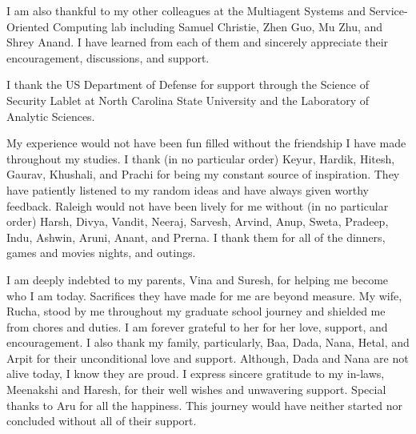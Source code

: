\begin{acknowledgements}
I am also thankful to my other colleagues at the Multiagent Systems and Service-Oriented Computing lab including Samuel Christie, Zhen Guo, Mu Zhu, and Shrey Anand. I have learned from each of them and sincerely appreciate their encouragement, discussions, and support. 

I thank the US Department of Defense for support through the
Science of Security Lablet at North Carolina State University and the Laboratory of Analytic Sciences.

My experience would not have been fun filled without the friendship I have made throughout my studies. 
I thank (in no particular order) Keyur, Hardik, Hitesh, Gaurav, Khushali, and Prachi for being my constant source of inspiration. 
They have patiently listened to my random ideas and have always given worthy feedback. 
Raleigh would not have been lively for me without (in no particular order) Harsh, Divya, Vandit, Neeraj, Sarvesh, Arvind, Anup, Sweta, Pradeep, Indu, Ashwin, Aruni, Anant, and Prerna.
I thank them for all of the dinners, games and movies nights, and outings. 

I am deeply indebted to my parents, Vina and Suresh, for helping me become who I am today. 
Sacrifices they have made for me are beyond measure. 
My wife, Rucha, stood by me throughout my graduate school journey and shielded me from chores and duties. 
I am forever grateful to her for her love, support, and encouragement. 
I also thank my family, particularly, Baa, Dada, Nana, Hetal, and Arpit for their unconditional love and support. 
Although, Dada and Nana are not alive today, I know they are proud. 
I express sincere gratitude to my in-laws, Meenakshi and Haresh, for their well wishes and unwavering support. 
Special thanks to Aru for all the happiness. 
This journey would have neither started nor concluded without all of their support. 

\end{acknowledgements}

\thesistableofcontents

\thesislistoftables

\thesislistoffigures
